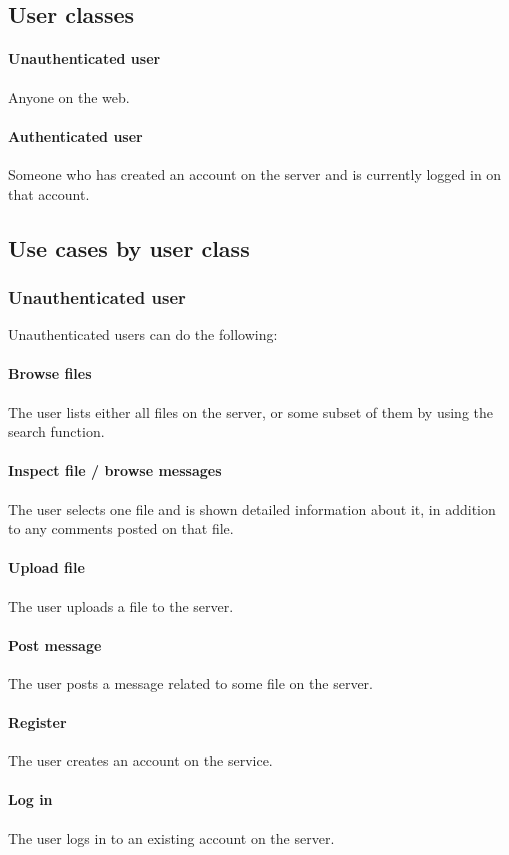 \documentclass[10pt,a4paper]{article}
\begin{document}
\subsection{User classes}
\paragraph{Unauthenticated user}
Anyone on the web.

\paragraph{Authenticated user}
Someone who has created an account on the server and is currently logged in on that account.

\subsection{Use cases by user class}
\subsubsection{Unauthenticated user}
Unauthenticated users can do the following:
\paragraph{Browse files}
The user lists either all files on the server, or some subset of them by using the search function.
\paragraph{Inspect file / browse messages}
The user selects one file and is shown detailed information about it, in addition to any comments posted on that file.
\paragraph{Upload file}
The user uploads a file to the server.
\paragraph{Post message}
The user posts a message related to some file on the server.

\paragraph{Register}
The user creates an account on the service.
\paragraph{Log in}
The user logs in to an existing account on the server.
\end{document}

